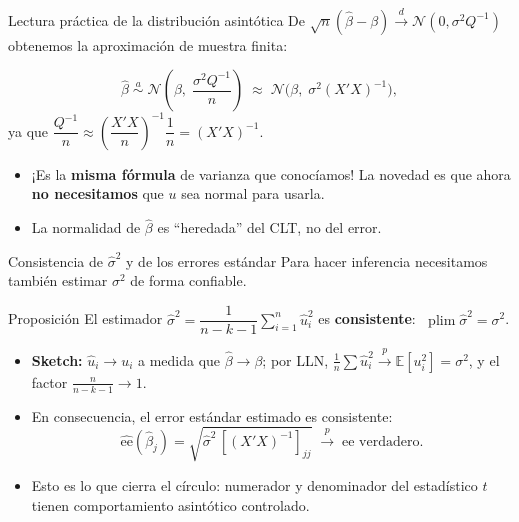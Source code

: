 \documentclass{beamer}
\DeclareMathOperator*{\plim}{plim}
\begin{document}
\begin{frame}{Lectura práctica de la distribución asintótica}
    De $\sqrt{n}(\hat{\beta}-\beta)\overset{d}{\to}\mathcal{N}(0,\sigma^2 Q^{-1})$ obtenemos la aproximación de muestra finita:
    \begin{tcolorbox}[colback=blue!5!white, colframe=blue!75!black, title=Distribución aproximada de $\hat{\beta}$]
    \[
    \hat{\beta} \;\overset{a}{\sim}\; \mathcal{N}\!\left(\beta,\; \frac{\sigma^2 Q^{-1}}{n}\right)
    \;\approx\; \mathcal{N}\!\big(\beta,\; \sigma^2 (X'X)^{-1}\big),
    \]
    ya que $\dfrac{Q^{-1}}{n}\approx \left(\dfrac{X'X}{n}\right)^{-1}\dfrac{1}{n} = (X'X)^{-1}$.
    \end{tcolorbox}
    \pause
    \begin{itemize}
        \item ¡Es la \textbf{misma fórmula} de varianza que conocíamos! La novedad es que ahora \textbf{no necesitamos} que $u$ sea normal para usarla.
        \item La normalidad de $\hat{\beta}$ es ``heredada'' del CLT, no del error.
    \end{itemize}
\end{frame}

\begin{frame}{Consistencia de $\hat{\sigma}^2$ y de los errores estándar}
    Para hacer inferencia necesitamos también estimar $\sigma^2$ de forma confiable.
    \begin{block}{Proposición}
    El estimador $\hat{\sigma}^2 = \dfrac{1}{n-k-1}\sum_{i=1}^n \hat{u}_i^2$ es \textbf{consistente}: $\;\plim\hat{\sigma}^2 = \sigma^2$.
    \end{block}
    \pause
    \begin{itemize}
        \item \textbf{Sketch:} $\hat{u}_i \to u_i$ a medida que $\hat{\beta}\to\beta$; por LLN, $\tfrac{1}{n}\sum\hat{u}_i^2 \overset{p}{\to}\mathbb{E}[u_i^2]=\sigma^2$, y el factor $\tfrac{n}{n-k-1}\to 1$.
        \pause
        \item En consecuencia, el error estándar estimado es consistente:
        \[
        \widehat{\text{ee}}(\hat{\beta}_j) = \sqrt{\hat{\sigma}^2\,[(X'X)^{-1}]_{jj}} \;\overset{p}{\to}\; \text{ee verdadero}.
        \]
        \item Esto es lo que cierra el círculo: numerador y denominador del estadístico $t$ tienen comportamiento asintótico controlado.
    \end{itemize}
\end{frame}
\end{document}

